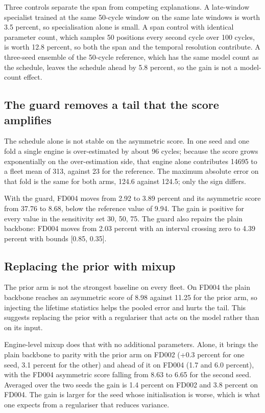 \documentclass[journal]{IEEEtran}
\begin{document}
Three controls separate the span from competing explanations. A late-window specialist trained at the same 50-cycle window on the same late windows is worth 3.5 percent, so specialisation alone is small. A span control with identical parameter count, which samples 50 positions every second cycle over 100 cycles, is worth 12.8 percent, so both the span and the temporal resolution contribute. A three-seed ensemble of the 50-cycle reference, which has the same model count as the schedule, leaves the schedule ahead by 5.8 percent, so the gain is not a model-count effect.

\subsection{The guard removes a tail that the score amplifies}
The schedule alone is not stable on the asymmetric score. In one seed and one fold a single engine is over-estimated by about 96 cycles; because the score grows exponentially on the over-estimation side, that engine alone contributes 14695 to a fleet mean of 313, against 23 for the reference. The maximum absolute error on that fold is the same for both arms, 124.6 against 124.5; only the sign differs.

With the guard, FD004 moves from 2.92 to 3.89 percent and its asymmetric score from 37.76 to 8.68, below the reference value of 9.94. The gain is positive for every value in the sensitivity set {30, 50, 75}. The guard also repairs the plain backbone: FD004 moves from 2.03 percent with an interval crossing zero to 4.39 percent with bounds [0.85, 0.35].

\subsection{Replacing the prior with mixup}
The prior arm is not the strongest baseline on every fleet. On FD004 the plain backbone reaches an asymmetric score of 8.98 against 11.25 for the prior arm, so injecting the lifetime statistics helps the pooled error and hurts the tail. This suggests replacing the prior with a regulariser that acts on the model rather than on its input.

Engine-level mixup does that with no additional parameters. Alone, it brings the plain backbone to parity with the prior arm on FD002 (+0.3 percent for one seed, 3.1 percent for the other) and ahead of it on FD004 (1.7 and 6.0 percent), with the FD004 asymmetric score falling from 8.63 to 6.65 for the second seed. Averaged over the two seeds the gain is 1.4 percent on FD002 and 3.8 percent on FD004. The gain is larger for the seed whose initialisation is worse, which is what one expects from a regulariser that reduces variance.
\end{document}
